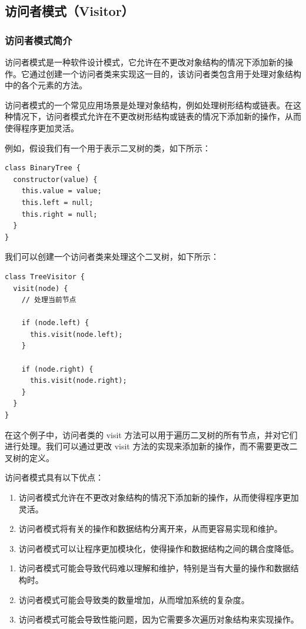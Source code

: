 \subsection{访问者模式（Visitor）}

\subsubsection{访问者模式简介}

访问者模式是一种软件设计模式，它允许在不更改对象结构的情况下添加新的操作。它通过创建一个访问者类来实现这一目的，该访问者类包含用于处理对象结构中的各个元素的方法。

访问者模式的一个常见应用场景是处理对象结构，例如处理树形结构或链表。在这种情况下，访问者模式允许在不更改树形结构或链表的情况下添加新的操作，从而使得程序更加灵活。

例如，假设我们有一个用于表示二叉树的类，如下所示：

\begin{lstlisting}
class BinaryTree {
  constructor(value) {
    this.value = value;
    this.left = null;
    this.right = null;
  }
}
\end{lstlisting}

我们可以创建一个访问者类来处理这个二叉树，如下所示：

\begin{lstlisting}
class TreeVisitor {
  visit(node) {
    // 处理当前节点

    if (node.left) {
      this.visit(node.left);
    }

    if (node.right) {
      this.visit(node.right);
    }
  }
}
\end{lstlisting}

在这个例子中，访问者类的 visit 方法可以用于遍历二叉树的所有节点，并对它们进行处理。我们可以通过更改 visit 方法的实现来添加新的操作，而不需要更改二叉树的定义。

访问者模式具有以下优点：

\begin{enumerate}
\item 访问者模式允许在不更改对象结构的情况下添加新的操作，从而使得程序更加灵活。
\item 访问者模式将有关的操作和数据结构分离开来，从而更容易实现和维护。
\item 访问者模式可以让程序更加模块化，使得操作和数据结构之间的耦合度降低。
\end{enumerate}

\begin{enumerate}
\item 访问者模式可能会导致代码难以理解和维护，特别是当有大量的操作和数据结构时。
\item 访问者模式可能会导致类的数量增加，从而增加系统的复杂度。
\item 访问者模式可能会导致性能问题，因为它需要多次遍历对象结构来实现操作。
\end{enumerate}

